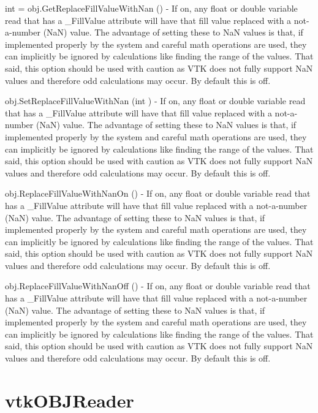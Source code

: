 \begin{DoxyItemize}
\item {\ttfamily int = obj.\-Get\-Replace\-Fill\-Value\-With\-Nan ()} -\/ If on, any float or double variable read that has a \-\_\-\-Fill\-Value attribute will have that fill value replaced with a not-\/a-\/number (Na\-N) value. The advantage of setting these to Na\-N values is that, if implemented properly by the system and careful math operations are used, they can implicitly be ignored by calculations like finding the range of the values. That said, this option should be used with caution as V\-T\-K does not fully support Na\-N values and therefore odd calculations may occur. By default this is off.  
\item {\ttfamily obj.\-Set\-Replace\-Fill\-Value\-With\-Nan (int )} -\/ If on, any float or double variable read that has a \-\_\-\-Fill\-Value attribute will have that fill value replaced with a not-\/a-\/number (Na\-N) value. The advantage of setting these to Na\-N values is that, if implemented properly by the system and careful math operations are used, they can implicitly be ignored by calculations like finding the range of the values. That said, this option should be used with caution as V\-T\-K does not fully support Na\-N values and therefore odd calculations may occur. By default this is off.  
\item {\ttfamily obj.\-Replace\-Fill\-Value\-With\-Nan\-On ()} -\/ If on, any float or double variable read that has a \-\_\-\-Fill\-Value attribute will have that fill value replaced with a not-\/a-\/number (Na\-N) value. The advantage of setting these to Na\-N values is that, if implemented properly by the system and careful math operations are used, they can implicitly be ignored by calculations like finding the range of the values. That said, this option should be used with caution as V\-T\-K does not fully support Na\-N values and therefore odd calculations may occur. By default this is off.  
\item {\ttfamily obj.\-Replace\-Fill\-Value\-With\-Nan\-Off ()} -\/ If on, any float or double variable read that has a \-\_\-\-Fill\-Value attribute will have that fill value replaced with a not-\/a-\/number (Na\-N) value. The advantage of setting these to Na\-N values is that, if implemented properly by the system and careful math operations are used, they can implicitly be ignored by calculations like finding the range of the values. That said, this option should be used with caution as V\-T\-K does not fully support Na\-N values and therefore odd calculations may occur. By default this is off.  
\end{DoxyItemize}\hypertarget{vtkio_vtkobjreader}{}\section{vtk\-O\-B\-J\-Reader}\label{vtkio_vtkobjreader}
